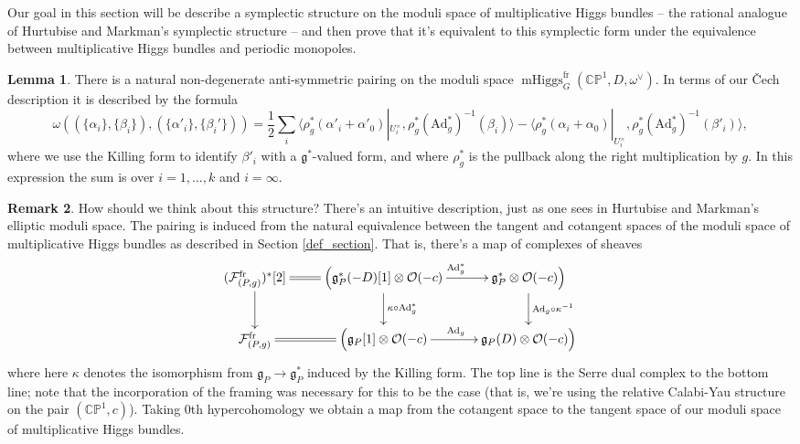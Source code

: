 \documentclass[11pt, oneside, reqno]{amsart}
\theoremstyle{definition} \newtheorem{definition}{Definition}[section]
\newtheorem{lemma}[definition]{Lemma}
\theoremstyle{definition} \newtheorem{remark}[definition]{Remark}
\theoremstyle{definition} \newtheorem{remarks}[definition]{Remarks}
\theoremstyle{definition} \newtheorem{question}[definition]{Question}
\theoremstyle{definition} \newtheorem*{note}{Note}
\theoremstyle{definition} \newtheorem{example}[definition]{Example}
\theoremstyle{definition} \newtheorem{examples}[definition]{Examples}
\renewcommand{\gg}{\mathfrak{g}}
\newcommand{\bb}[1]{\mathbb{#1}}
\newcommand{\mr}[1]{\mathrm{#1}}
\newcommand{\mc}[1]{\mathcal{#1}}
\newcommand{\OO}{\mathcal{O}}
\DeclareMathOperator{\mhiggs}{mHiggs}
\newcommand{\fr}{\mathrm{fr}}
\newcommand{\Ad}{\mr{Ad}}
\begin{document}
Our goal in this section will be describe a symplectic structure on the moduli space of multiplicative Higgs bundles -- the rational analogue of Hurtubise and Markman's symplectic structure -- and then prove that it's equivalent to this symplectic form under the equivalence between multiplicative Higgs bundles and periodic monopoles.

\begin{lemma} \label{sym_nondegeneracy_lemma}
There is a natural non-degenerate anti-symmetric pairing on the moduli space $\mhiggs_G^{\fr}(\bb{CP}^1,D,\omega^\vee)$.  In terms of our \v Cech description it is described by the formula 
\[\omega((\{\alpha_i\}, \{\beta_i\}), (\{\alpha'_i\},\{\beta_i'\})) = \frac 12 \sum_i \langle \rho_g^*(\alpha'_i + \alpha'_0)|_{U^\times_i}, \rho_g^*(\Ad_g^*)^{-1}(\beta_i) \rangle - \langle \rho_g^*(\alpha_i + \alpha_0)|_{U^\times_i}, \rho_g^*(\Ad_g^*)^{-1}(\beta'_i) \rangle,\]
where we use the Killing form to identify $\beta'_i$ with a $\gg^*$-valued form, and where $\rho_g^*$ is the pullback along the right multiplication by $g$.  In this expression the sum is over $i=1,\ldots,k$ and $i=\infty$.
\end{lemma}

\begin{remark}
How should we think about this structure?  There's an intuitive description, just as one sees in Hurtubise and Markman's elliptic moduli space.  The pairing is induced from the natural equivalence between the tangent and cotangent spaces of the moduli space of multiplicative Higgs bundles as described in Section \ref{def_section}.  That is, there's a map of complexes of sheaves
\[\xymatrix{
(\mc F^\fr_{(P,g)})^*[2] \ar@{=}[r] \ar[d] &\Big(\gg^*_P(-D)[1] \otimes \OO(-c) \ar[d]^{\kappa \circ \Ad_g^*} \ar[r]^{\Ad_g^*} &\gg^*_P \otimes \OO(-c)\Big)\ar[d]^{\Ad_g \circ \kappa^{-1}} \\
\mc F^\fr_{(P,g)} \ar@{=}[r] &\Big(\gg_P[1] \otimes \OO(-c) \ar[r]^{\Ad_g} &\gg_P(D) \otimes \OO(-c)\Big)
}\]
where here $\kappa$ denotes the isomorphism from $\gg_P \to \gg^*_P$ induced by the Killing form.  The top line is the Serre dual complex to the bottom line; note that the incorporation of the framing was necessary for this to be the case (that is, we're using the relative Calabi-Yau structure on the pair $(\bb{CP}^1, c)$).  Taking 0th hypercohomology we obtain a map from the cotangent space to the tangent space of our moduli space of multiplicative Higgs bundles.
\end{remark}
\end{document}
